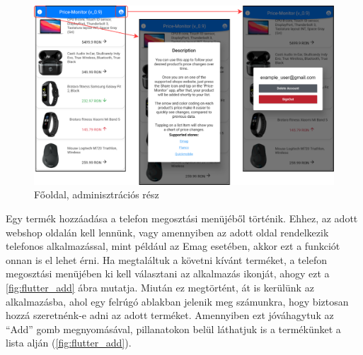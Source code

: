 \begin{figure}[H]
    \centering
    \includegraphics[scale=1]{figures/images/flutter_home_info_user.png}
    \caption{Főoldal, adminisztrációs rész}
    \label{fig:flutter_home_info_user}
\end{figure}

Egy termék hozzáadása a telefon megosztási menüjéből történik. Ehhez, az adott webshop oldalán kell lennünk, vagy amennyiben az adott oldal rendelkezik telefonos alkalmazással, mint például az Emag esetében, akkor ezt a funkciót onnan is el lehet érni. Ha megtaláltuk a követni kívánt terméket, a telefon megosztási menüjében ki kell választani az alkalmazás ikonját, ahogy ezt a \ref{fig:flutter_add} ábra mutatja. Miután ez megtörtént, át is kerülünk az alkalmazásba, ahol egy felrúgó ablakban jelenik meg számunkra, hogy biztosan hozzá szeretnénk-e adni az adott terméket. Amennyiben ezt jóváhagytuk az “Add” gomb megnyomásával, pillanatokon belül láthatjuk is a termékünket a lista alján (\ref{fig:flutter_add}).

